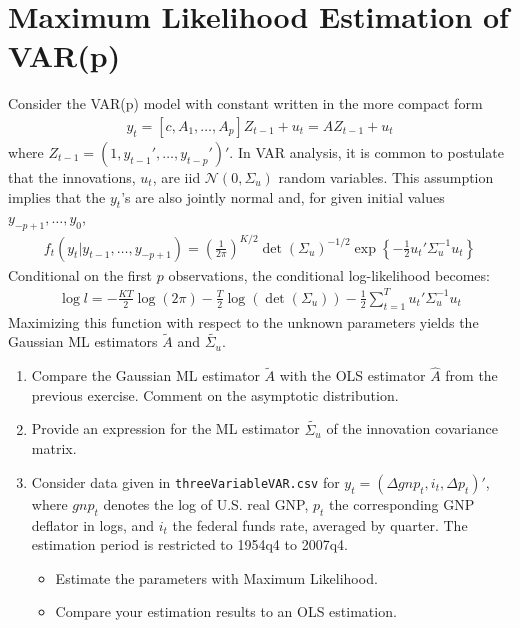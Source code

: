 \section[Maximum Likelihood Estimation of VAR(p)]{Maximum Likelihood Estimation of VAR(p)\label{ex:MaximumLikelihoodEstimationVARp}}
Consider the VAR(p) model with constant written in the more compact form
\begin{align*}
y_t = [c, A_1, \ldots, A_p] Z_{t-1} + u_t = A Z_{t-1}+ u_t
\end{align*}
where \(Z_{t-1}=(1,y_{t-1}',\ldots ,y_{t-p}')'\).
In VAR analysis, it is common to postulate that the innovations, \(u_t\), are iid \(\mathcal{N}(0,\Sigma_u)\) random variables.
This assumption implies that the \(y_t\)'s are also jointly normal
  and, for given initial values \(y_{-p+1},\ldots ,y_{0}\),
\begin{align*}
f_t(y_t|y_{t-1},\ldots ,y_{-p+1})={\left(\frac{1}{2\pi}\right)}^{K/2} {\det(\Sigma_u)}^{-1/2} \exp\left \{ -\frac{1}{2}u_t'\Sigma_u^{-1}u_t \right \}
\end{align*}
Conditional on the first \(p\) observations, the conditional log-likelihood becomes:
\begin{align*}
\log l = -\frac{KT}{2}\log(2\pi) - \frac{T}{2} \log(\det(\Sigma_u))- \frac{1}{2}\sum_{t=1}^T u_t'\Sigma_u^{-1}u_t
\end{align*}
Maximizing this function with respect to the unknown parameters
  yields the Gaussian ML estimators \(\widetilde{A}\) and \(\widetilde{\Sigma_u}\).

\begin{enumerate}
\item Compare the Gaussian ML estimator \(\widetilde{A}\) with the OLS estimator \(\widehat{A}\) from the previous exercise.
Comment on the asymptotic distribution.

\item Provide an expression for the ML estimator \(\widetilde{\Sigma_u}\) of the innovation covariance matrix.
 	
\item Consider data given in \texttt{threeVariableVAR.csv} for \(y_t = (\Delta gnp_t,i_t,\Delta p_t)'\),
where \(gnp_t\) denotes the log of U.S. real GNP,
\(p_t\) the corresponding GNP deflator in logs,
and \(i_t\) the federal funds rate, averaged by quarter.
The estimation period is restricted to 1954q4 to 2007q4. 
\begin{itemize}
  \item Estimate the parameters with Maximum Likelihood.
  \item Compare your estimation results to an OLS estimation.
\end{itemize}

\end{enumerate}

